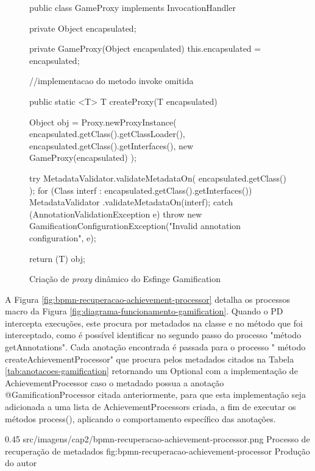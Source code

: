 \begin{figure}[H]
    \centering
    \caption{Criação de \textit{proxy} dinâmico do Esfinge Gamification}
    \begin{java}
public class GameProxy implements InvocationHandler {
        private Object encapsulated;

	private GameProxy(Object encapsulated) {
		this.encapsulated = encapsulated;
        }
        
//implementacao do metodo invoke omitida
    
	public static <T> T createProxy(T encapsulated) {
		Object obj = Proxy.newProxyInstance(
		        encapsulated.getClass().getClassLoader(),
			encapsulated.getClass().getInterfaces(), 
			new GameProxy(encapsulated)
		);

		try {
			MetadataValidator.validateMetadataOn(
			    encapsulated.getClass()
			);
			for (Class interf : encapsulated.getClass().getInterfaces()) {
				MetadataValidator
				.validateMetadataOn(interf);
			}
		} catch (AnnotationValidationException e) {
			throw new GamificationConfigurationException("Invalid annotation configuration", e);
		}

		return (T) obj;
	}
}
    \end{java}
    \label{fig:gamification-proxy}
\end{figure}

A Figura \ref{fig:bpmn-recuperacao-achievement-processor} detalha os processos macro da Figura \ref{fig:diagrama-funcionamento-gamification}. Quando o PD intercepta execuções, este procura por metadados na classe e no método que foi interceptado, como é possível identificar no segundo passo do processo "método getAnnotations". %
Cada anotação encontrada é passada para o processo " método createAchievementProcessor" que procura pelos metadados citados na Tabela \ref{tab:anotacoes-gamification} retornando um Optional com a implementação de AchievementProcessor caso o metadado possua a anotação @GamificationProcessor citada anteriormente, para que esta implementação seja adicionada a uma lista de AchievementProcessors criada, a fim de executar os métodos process(), aplicando o comportamento específico das anotações.

\begin{image}
{0.45} %
{src/imagens/cap2/bpmn-recuperacao-achievement-processor.png} %
{Processo de recuperação de metadados} %
{fig:bpmn-recuperacao-achievement-processor} %
{Produção do autor} %
\end{image}

